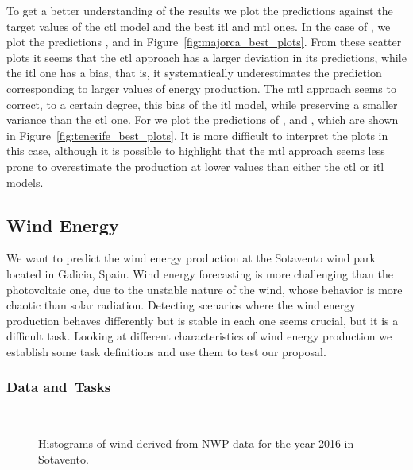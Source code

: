 %
To get a better understanding of the results we plot the predictions against the target values of the \acrshort{ctl} model and the best \acrshort{itl} and \acrshort{mtl} ones.
%
In the case of , we plot the predictions ,  and  in Figure~\ref{fig:majorca_best_plots}.
From these scatter plots it seems that the \acrshort{ctl} approach has a larger deviation in its predictions, while the \acrshort{itl} one has a bias, that is, it systematically underestimates the prediction corresponding to larger values of energy production.
The \acrshort{mtl} approach seems to correct, to a certain degree, this bias of the \acrshort{itl} model, while preserving a smaller variance than the \acrshort{ctl} one.
%
For  we plot the predictions of ,  and , which are shown in Figure~\ref{fig:tenerife_best_plots}.
It is more difficult to interpret the plots in this case, although it is possible to highlight that the \acrshort{mtl} approach seems less prone to overestimate the production at lower values than either the \acrshort{ctl} or \acrshort{itl} models.







\subsection{Wind Energy}
We want to predict the wind energy production at the Sotavento wind park located in Galicia, Spain.
Wind energy forecasting is more challenging than the photovoltaic one, due to the unstable nature of the wind, whose behavior is more chaotic than solar radiation. Detecting scenarios where the wind energy production behaves differently but is stable in each one seems crucial, but it is a difficult task. Looking at different characteristics of wind energy production we establish some task definitions and use them to test our proposal. 

\subsubsection*{Data and~Tasks}

\begin{figure}[t!]
    \centering%
    \quad%
    \\
 \caption{\label{fig:wind_task_def} Histograms of wind derived from NWP data for the year 2016 in Sotavento.}
\end{figure}

